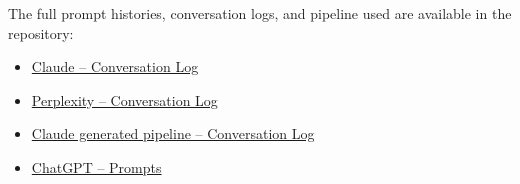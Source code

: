 \documentclass[11pt]{article}
\begin{document}
The full prompt histories, conversation logs, and pipeline used 
are available in the repository:
\begin{itemize}
  \item \href{https://github.com/AdalAG/15-C51-Credit-Report/blob/main/ai\_logs/claude\_conversation.rtf}{Claude -- Conversation Log}
  \item \href{https://github.com/AdalAG/15-C51-Credit-Report/blob/main/ai\_logs/Perplexity\_conversation.md}{Perplexity -- Conversation Log}
  \item \href{https://github.com/AdalAG/15-C51-Credit-Report/blob/main/Claude\_Pipeline.md}{Claude generated pipeline -- Conversation Log}
  \item \href{https://github.com/AdalAG/15-C51-Credit-Report/blob/main/ai\_logs/other_prompts.txt}{ChatGPT -- Prompts}
  
\end{itemize}


\end{document}
